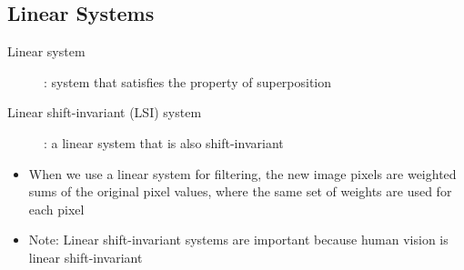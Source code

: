 \documentclass[letterpaper,12pt]{article}
\begin{document}
\subsection{Linear Systems}
\begin{description}
 \item[Linear system]: system that satisfies the property of superposition
 \item[Linear shift-invariant (LSI) system]: a linear system that is also shift-invariant
\end{description}
\begin{itemize}
 \item When we use a linear system for filtering, the new image pixels are weighted sums of the original pixel values, where the same set of weights are used for each pixel
 \item Note: Linear shift-invariant systems are important because human vision is linear shift-invariant
\end{itemize}
\end{document}
